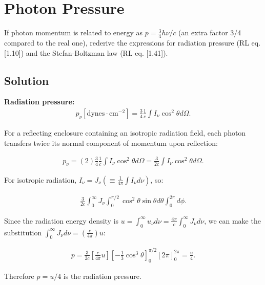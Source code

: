 \documentclass[12pt]{article}
\begin{document}

\section{Photon Pressure}

If photon momentum is related to energy as $p = \frac{3}{4}h\nu/c$ (an extra factor 3/4 compared to the real one), rederive the expressions for radiation pressure (RL eq. [1.10]) and the Stefan-Boltzman law (RL eq. [1.41]).

\subsection*{Solution}

{\noindent}\textbf{Radiation pressure:}
\begin{align*}
p_\nu[\mathrm{dynes\cdot cm^{-2}}] = \frac{3}{4}\frac{1}{c}\int I_\nu\cos^2\theta d\Omega.
\end{align*}

For a reflecting enclosure containing an isotropic radiation field, each photon transfers twice its normal component of momentum upon reflection:

\begin{align*}
p_\nu = (2)\frac{3}{4}\frac{1}{c}\int I_\nu\cos^2\theta d\Omega = \frac{3}{2c}\int I_\nu\cos^2\theta d\Omega.
\end{align*}

For isotropic radiation, $I_\nu = J_\nu (\equiv \frac{1}{4\pi}\int I_\nu d\nu)$, so:

\begin{align*}
\frac{3}{2c}\int_0^{\infty} J_\nu \int_0^{\pi/2}\cos^2\theta\sin\theta d\theta \int_0^{2\pi} d\phi.
\end{align*}

Since the radiation energy density is $u = \int_0^{\infty}u_\nu d\nu = \frac{4\pi}{c}\int_0^{\infty}J_\nu d\nu$, we can make the substitution $\int_0^{\infty}J_\nu d\nu = \left(\frac{c}{4\pi}\right)u$:

\begin{align*}
p = \frac{3}{2c}\left[\frac{c}{4\pi}u\right]\left[-\frac{1}{3}\cos^3\theta\right]_0^{\pi/2}\left[2\pi\right]_0^{2\pi} = \frac{u}{4}.
\end{align*}

Therefore $p = u/4$ is the radiation pressure.
\end{document}
